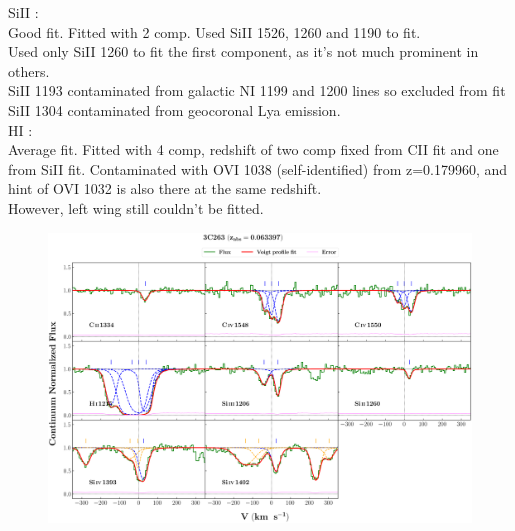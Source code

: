 \documentclass[12pt]{report}
\begin{document}
SiII :  \\  \hspace*{1.5cm}
        Good fit. Fitted with 2 comp. Used SiII 1526, 1260 and 1190 to fit. \\
        Used only SiII 1260 to fit the first component, as it's not much prominent in others. \\
        SiII 1193 contaminated from galactic NI 1199 and 1200 lines so excluded from fit \\
        SiII 1304 contaminated from geocoronal Lya emission. \\

HI :  \\  \hspace*{1.5cm}
        Average fit. Fitted with 4 comp, redshift of two comp fixed from CII fit and one from SiII fit. Contaminated with OVI 1038 (self-identified) from z=0.179960, and hint of OVI 1032 is also there at the same redshift. \\
        However, left wing still couldn't be fitted.


\newpage

\begin{landscape}

\begin{figure}
    \centering
    \vspace{-20mm}
    \hspace*{-35mm}
    \includegraphics[width=1.25\linewidth]{System-Plots/3C263_z=0.063397_sys_plot.png}
\end{figure}

\end{landscape}
\end{document}
